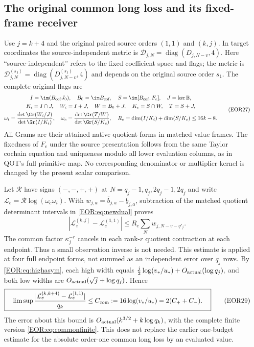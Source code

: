 \documentclass[11pt,a4paper]{article}
\begin{document}
\subsection{The original common long loss and its fixed-frame receiver}
Use $j=k+4$ and the original paired source orders $(1,1)$ and $(k,j)$.
In target coordinates the source-independent metric is
$\mathcal D_{j,N}=\operatorname{diag}(D_{j,N-v},4)$.
Here ``source-independent'' refers to the fixed coefficient space and flags;
the metric is $\mathcal D_{j,N}^{(s_1)}
=\operatorname{diag}(D_{j,N-v}^{(s_1)},4)$ and depends on the original
source order $s_1$. The complete original flags are
\begin{equation}
\begin{gathered}
 I=\im(B_{\rm cof}J_0),\quad B_0=\im B_{\rm cof},\quad
 S=\im[B_{\rm cof},F_e],\quad J=\ker\mathbb B,\\
 K_i=I\cap J,\quad W_i=I+J,\quad W=B_0+J,\quad
 K_c=S\cap W,\quad T=S+J,\\
 \omega_i=\frac{\det\Gr(W_i/J)}{\det\Gr(I/K_i)},\quad
 \omega_c=\frac{\det\Gr(T/W)}{\det\Gr(S/K_c)},\quad
 R_e=\dim(I/K_i)+\dim(S/K_c)\le16k-8.
\end{gathered}\label{EOR:eq:flags}
\tag{EOR27}
\end{equation}
All Grams are their attained native quotient forms in matched value frames.
The fixedness of $F_e$ under the source presentation follows from the same
Taylor cochain equation and uniqueness modulo all lower evaluation columns,
as in QOT's full primitive map. No corresponding denominator or multiplier
kernel is changed by the present scalar comparison.

Let $\mathcal R$ have signs $(-,-,+,+)$ at
$N=q_j-1,q_j,2q_j-1,2q_j$ and write
$\mathcal L_e=\mathcal R\log(\omega_c\omega_i)$.
With $w_{j,a}=\overline b_{j,a}-\underline b_{j,a}$, subtraction of the
matched quotient determinant intervals in \eqref{EOR:eq:newdual} proves
\begin{equation}
 \boxed{\quad
 |\mathcal L_e^{(k,j)}-\mathcal L_e^{(1,1)}|
       \le R_e\sum_Nw_{j,N-v-q'_j}.
 \quad}\label{EOR:eq:commonfinite}
\tag{EOR28}
\end{equation}
The common factor $\kappa_j^{-r}$ cancels in each rank-$r$ quotient contraction
at each endpoint. Thus a small observation inverse is not needed. This estimate
is applied at four full endpoint forms, not summed as an independent error over
$q_j$ rows.
By \eqref{EOR:eq:highasym}, each high width equals
$\frac j2\log(v_*/u_*)+O_{\rm actual}(\log q_j)$, and both low widths are
$O_{\rm actual}(\sqrt j+\log q_j)$. Hence
\begin{equation}
 \boxed{\quad
 \limsup\frac{|\mathcal L_e^{(k,k+4)}-\mathcal L_e^{(1,1)}|}{q_k}
 \le C_{\rm com}:=16\log(v_*/u_*)=2(C_++C_-).
 \quad}\label{EOR:eq:commonlimit}
\tag{EOR29}
\end{equation}
The error about this bound is $O_{\rm actual}(k^{3/2}+k\log q_k)$,
with the complete finite version \eqref{EOR:eq:commonfinite}.
This does not replace the earlier one-budget estimate for the absolute
order-one common long loss by an evaluated value.
\end{document}
